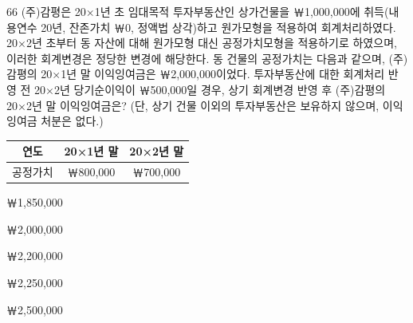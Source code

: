 \begin{question}{66}
(주)감평은 20×1년 초 임대목적 투자부동산인 상가건물을 ￦1,000,000에 취득(내용연수 20년, 잔존가치 ￦0, 정액법 상각)하고 원가모형을 적용하여 회계처리하였다. 20×2년 초부터 동 자산에 대해 원가모형 대신 공정가치모형을 적용하기로 하였으며, 이러한 회계변경은 정당한 변경에 해당한다. 동 건물의 공정가치는 다음과 같으며, (주)감평의 20×1년 말 이익잉여금은 ￦2,000,000이었다. 투자부동산에 대한 회계처리 반영 전 20×2년 당기순이익이 ￦500,000일 경우, 상기 회계변경 반영 후 (주)감평의 20×2년 말 이익잉여금은? (단, 상기 건물 이외의 투자부동산은 보유하지 않으며, 이익잉여금 처분은 없다.)
\par
{\small\centering
\begin{tabular}{|c|c|c|}\hline
연도 & 20×1년 말 & 20×2년 말 \\\hline
공정가치 & ￦800,000 & ￦700,000 \\\hline
\end{tabular}\par}
\begin{choices}
  \item ￦1,850,000
  \item ￦2,000,000
  \item ￦2,200,000
  \item ￦2,250,000
  \item ￦2,500,000
\end{choices}
\end{question}

